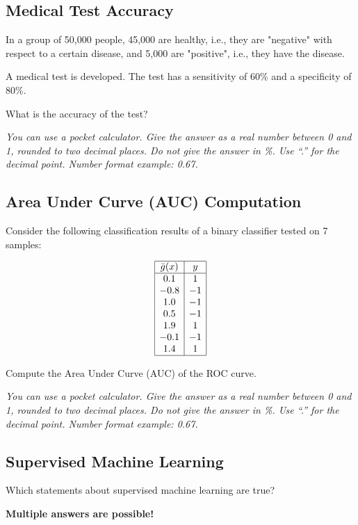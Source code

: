 \documentclass{article}
\begin{document}
\subsection*{Medical Test Accuracy}

In a group of 50,000 people, 45,000 are healthy, i.e., they are "negative" with respect to a certain disease, and 5,000 are "positive", i.e., they have the disease.

A medical test is developed. The test has a sensitivity of 60\% and a specificity of 80\%.

What is the accuracy of the test?

\textit{You can use a pocket calculator. Give the answer as a real number between 0 and 1, rounded to two decimal places. Do not give the answer in \%. Use ``.'' for the decimal point. Number format example: 0.67.}

\subsection*{Area Under Curve (AUC) Computation}

Consider the following classification results of a binary classifier tested on 7 samples:

\[
\begin{array}{|c|c|}
\hline
\bar{g}(x) & y \\
\hline
0.1 & 1 \\
-0.8 & -1 \\
1.0 & -1 \\
0.5 & -1 \\
1.9 & 1 \\
-0.1 & -1 \\
1.4 & 1 \\
\hline
\end{array}
\]

Compute the Area Under Curve (AUC) of the ROC curve.

\textit{You can use a pocket calculator. Give the answer as a real number between 0 and 1, rounded to two decimal places. Do not give the answer in \%. Use ``.'' for the decimal point. Number format example: 0.67.}

\subsection*{Supervised Machine Learning}

Which statements about supervised machine learning are true?

\textbf{Multiple answers are possible!}
\end{document}
